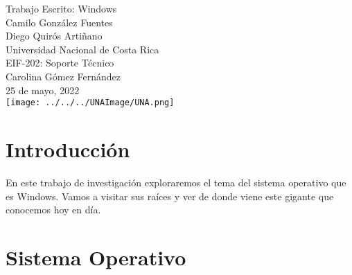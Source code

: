 \documentclass[stu, 12pt, letterpaper, donotrepeattitle, floatsintext, natbib, helv]{apa7}
\begin{document}
\begin{titlepage}
    \centering
    \vfill
    \LARGE Trabajo Escrito: Windows\\
    \vskip2cm
    \large Camilo González Fuentes \\
    \large Diego Quirós Artiñano \\
    Universidad Nacional de Costa Rica \\
    EIF-202: Soporte Técnico \\ 
    Carolina Gómez Fernández \\
    25 de mayo, 2022 \\
    \vfill
    \texttt{[image: ../../../UNAImage/UNA.png]} \\
    \vfill
    \vfill
\end{titlepage}

\addto{}
\tableofcontents
\setcounter{tocdepth}{2}
\newpage


\section*{Introducción}
{}

En este trabajo de investigación exploraremos el tema del sistema operativo que es Windows. Vamos a visitar sus raíces y ver de donde viene este gigante que conocemos hoy en día.

\section*{Sistema Operativo}
{}
\end{document}
